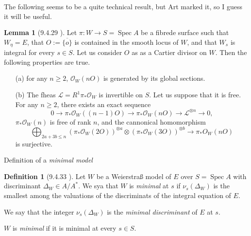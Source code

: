 \documentclass[a4paper]{report}
\DeclareMathOperator{\spec}{Spec}
\theoremstyle{definition}
\newtheorem*{lemma}{Lemma}
\newtheorem*{definition}{Definition}
\begin{document}
The following seems to be a quite technical result, but Art marked it, so I guess it will be useful. 
\begin{lemma}
	[9.4.29 \cite{liu}]
	Let $\pi: W \to S = \spec A$ be a fibrede surface such that $W_\eta = E$, that $O := \overline{\{o\} }$ is contained in the smooth locus of $W$,
	and that $W_s$ is integral for every $s \in S$. 
	Let us consider $O$ as as a Cartier divisor on $W$. 
	Then the following properties are true. 
	\begin{enumerate}
		\item [(a)] for any $n \ge 2$, $\mathcal{O} _W(n O)$ is generated by its global sections. 
		\item [(b)] 
			The fheas $\mathcal{L}  = R^{1}\pi_*\mathcal{O} _W$ is invertible on $S$. 
			Let us suppose that it is free. 
			For any $n \ge 2$, there exists an exact sequence \[
				0 \to \pi_* \mathcal{O} _W((n -1)O) \to \pi_* \mathcal{O}_W(nO) \to \mathcal{L} ^{\otimes n} \to 0
			,\] 
			$\pi_* \mathcal{O}_W(n) $ is free of rank $n$, and the cannonical homomorphism \[
				\bigoplus_{2a + 3b \le n}(\pi_* \mathcal{O}_W(2O)) ^{ \otimes a} \otimes (\pi_* \mathcal{O}_W(3O)) ^{\otimes b} \to \pi_* O_W(nO)
			\] 
			is surjective. 
	\end{enumerate}
\end{lemma}

Definition of a \emph{minimal model}
\begin{definition}[9.4.33 \cite{liu}]
	Let $W $ be a Weierstraß model of $E$ over $S = \spec A$ with discriminant $\Delta_W \in A / A^*$. 
	We sya that $W$ is \emph{minimal} at $s$ if $\nu_s(\Delta_W)$ is the smallest among the valuations of the discriminats of the integral equation of $E$. 

	We say that the integer $\nu_s(\Delta_W)$ is the \emph{minimal discriminant} of $E$ at $s$. 

	$W$ is \emph{minimal} if it is minimal at every $s \in S$. 

\end{definition}
\end{document}

